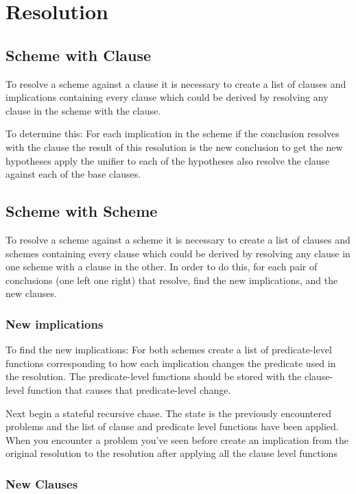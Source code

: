 \documentclass{article}
\begin{document}
\section{Resolution}

\subsection{Scheme with Clause}

To resolve a scheme against a clause it is necessary to create a list of clauses and implications containing every
clause which could be derived by resolving any clause in the scheme with the clause. 

To determine this:
For each implication in the scheme if the conclusion resolves with the clause 
  the result of this resolution is the new conclusion
  to get the new hypotheses apply the unifier to each of the hypotheses
  also resolve the clause against each of the base clauses.

\subsection{Scheme with Scheme}


    To resolve a scheme against a scheme it is necessary to create a list of clauses and schemes containing every clause which could be derived by resolving any clause in one scheme with a clause in the other.
    In order to do this, for each pair of conclusions (one left one right) that resolve, find the new implications, and the new clauses.

\subsubsection{New implications}
  
  To find the new implications: For both schemes create a list of predicate-level functions corresponding to how each implication changes the predicate
  used in the resolution.
  The predicate-level functions should be stored with the clause-level function that causes that predicate-level change.

  Next begin a stateful recursive chase.
    The state is the previously encountered problems and the list of clause and predicate level functions have been applied.
    When you encounter a problem you've seen before create an implication
    from the original resolution to the resolution after applying all the clause level functions

\subsubsection{New Clauses}
\end{document}
